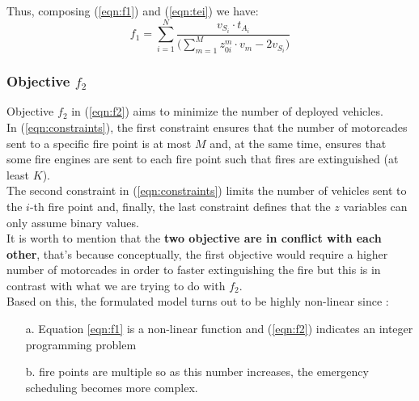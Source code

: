 Thus, composing (\ref{eqn:f1}) and (\ref{eqn:tei}) we have:
\begin{equation}
    f_1 = \sum_{i=1}^N \dfrac{v_{S_i}\cdot t_{A_i}}{\biggr(\sum_{m=1}^M z_{0i}^m \cdot v_m - 2v_{S_i} \biggl)}
\end{equation}

\subsubsection{Objective $f_2$}
Objective $f_2$ in (\ref{eqn:f2}) aims to minimize the number of deployed vehicles.\\
In (\ref{eqn:constraints}), the first constraint ensures that the number of motorcades sent to a specific fire point is at most $M$ and, at the same time, ensures that some fire engines are sent to each fire point such that fires are extinguished (at least $K$).\\
The second constraint in (\ref{eqn:constraints}) limits the number of vehicles sent to the $i$-th fire point and, finally, the last constraint defines that the $z$ variables can only assume binary values.\\
It is worth to mention that the \textbf{two objective are in conflict with each other}, that's because conceptually, the first objective would require a higher number of motorcades in order to faster extinguishing the fire but this is in contrast with what we are trying to do with $f_2$.\\
Based on this, the formulated model turns out to be highly non-linear since :
\begin{itemize}
    \item[a.] Equation \ref{eqn:f1} is a non-linear function and (\ref{eqn:f2}) indicates an integer programming problem
    \item[b.] fire points are multiple so as this number increases, the emergency scheduling becomes more complex.
\end{itemize}
